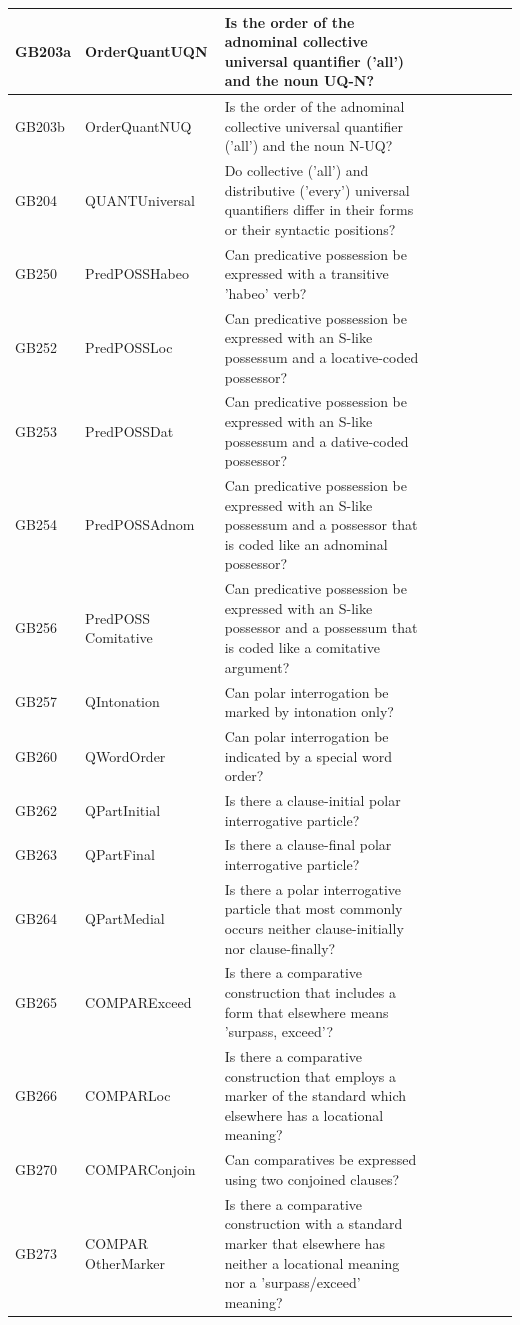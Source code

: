 \documentclass[draft,10pt]{article} %
\begin{document}
\begin{landscape}
\begin{longtable}{| l | p{4cm}| p{12cm}|p{2cm}|p{2cm}|p{2cm}|p{2cm}|p{2cm}|p{2cm}|}
GB203a & OrderQuantUQN&Is the order of the adnominal collective universal quantifier ('all') and the noun UQ-N?\\ \hline
GB203b & OrderQuantNUQ&Is the order of the adnominal collective universal quantifier ('all') and the noun N-UQ?\\ \hline
GB204 & QUANTUniversal&Do collective ('all') and distributive ('every') universal quantifiers differ in their forms or their syntactic positions?\\ \hline
GB250 & PredPOSSHabeo&Can predicative possession be expressed with a transitive 'habeo' verb?\\ \hline
GB252 & PredPOSSLoc&Can predicative possession be expressed with an S-like possessum and a locative-coded possessor?\\ \hline
GB253 & PredPOSSDat&Can predicative possession be expressed with an S-like possessum and a dative-coded possessor?\\ \hline
GB254 & PredPOSSAdnom&Can predicative possession be expressed with an S-like possessum and a possessor that is coded like an adnominal possessor?\\ \hline
GB256 & PredPOSS Comitative&Can predicative possession be expressed with an S-like possessor and a possessum that is coded like a comitative argument?\\ \hline
GB257 & QIntonation&Can polar interrogation be marked by intonation only?\\ \hline
GB260 & QWordOrder&Can polar interrogation be indicated by a special word order?\\ \hline
GB262 & QPartInitial&Is there a clause-initial polar interrogative particle?\\ \hline
GB263 & QPartFinal&Is there a clause-final polar interrogative particle?\\ \hline
GB264 & QPartMedial&Is there a polar interrogative particle that most commonly occurs neither clause-initially nor clause-finally?\\ \hline
GB265 & COMPARExceed&Is there a comparative construction that includes a form that elsewhere means 'surpass, exceed'?\\ \hline
GB266 & COMPARLoc&Is there a comparative construction that employs a marker of the standard which elsewhere has a locational meaning?\\ \hline
GB270 & COMPARConjoin&Can comparatives be expressed using two conjoined clauses?\\ \hline
GB273 & COMPAR OtherMarker&Is there a comparative construction with a standard marker that elsewhere has neither a locational meaning nor a 'surpass/exceed' meaning?\\ \hline

\end{longtable}
\end{landscape}
\end{document}
